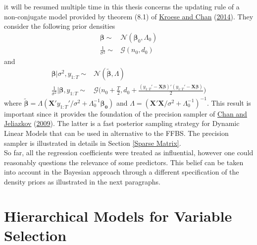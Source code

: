 \documentclass[
  12pt,
]{book}
\theoremstyle{break}
\theoremstyle{nonumberplain}
\begin{document}
it will be resumed multiple time in this thesis concerns the updating
rule of a non-conjugate model provided by theorem (8.1) of
\protect\hyperlink{ref-KC_2014}{Kroese and Chan}
(\protect\hyperlink{ref-KC_2014}{2014}). They consider the following
prior densities \begin{align*}
\boldsymbol{\beta} \sim & \mathcal{N}(\boldsymbol{\beta}_{0},\Lambda_{0})\\
\frac{1}{\sigma^{2}}\sim & \mathcal{G}(n_{0},d_{0})
\end{align*} and \begin{align*}
\boldsymbol{\beta} | \sigma^{2},y_{1:T} \sim & \mathcal{N}(\tilde{\boldsymbol{\beta}},\Lambda)\\
\frac{1}{\sigma^{2}}|\boldsymbol{\beta},y_{1:T} \sim & \mathcal{G}\bigg(n_{0}+\frac{T}{2},d_{0}+\frac{(y_{1:T}'-\boldsymbol{X}\boldsymbol{\beta})'(y_{1:T}'-\boldsymbol{X}\boldsymbol{\beta})}{2}\bigg)
\end{align*} where
\(\tilde{\boldsymbol{\beta}}=\Lambda(\boldsymbol{X}'y_{1:T}'/\sigma^{2}+\Lambda_{0}^{-1}\boldsymbol{\beta_{0}})\)
and
\(\Lambda=(\boldsymbol{X}'\boldsymbol{X}/\sigma^{2}+\Lambda^{-1}_{0})^{-1}\).
This result is important since it provides the foundation of the
precision sampler of \protect\hyperlink{ref-chan_jeliazkov_2009}{Chan
and Jeliazkov} (\protect\hyperlink{ref-chan_jeliazkov_2009}{2009}). The
latter is a fast posterior sampling strategy for Dynamic Linear Models
that can be used in alternative to the FFBS. The precision sampler is
illustrated in details in Section \ref{Sparse Matrix}.\\
So far, all the regression coefficients were treated as influential,
however one could reasonably questions the relevance of some predictors.
This belief can be taken into account in the Bayesian approach through a
different specification of the density priors as illustrated in the next
paragraphs.

\section{Hierarchical Models for Variable Selection} \label{Hierarchical Models for Variable Selection}
\end{document}
